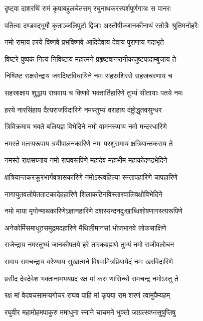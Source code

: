\twolineshloka
{दृष्ट्वा दाशरथिं रामं कृपाबहुलचेतसम्}
{रघुनाथकरस्पर्शपूर्णगात्रः स वानरः}%

\twolineshloka
{पतित्वा दण्डवद्भूमौ कृताञ्जलिपुटो द्विजाः}
{अस्तौषीज्जानकीनाथं स्तोत्रैः श्रुतिमनोहरैः}%


\twolineshloka
{नमो रामाय हरये विष्णवे प्रभविष्णवे}
{आदिदेवाय देवाय पुराणाय गदाभृते}%

\twolineshloka
{विष्टरे पुष्पकं नित्यं निविष्टाय महात्मने}
{प्रहृष्टवानरानीकजुष्टपादाम्बुजाय ते}%

\twolineshloka
{निष्पिष्ट राक्षसेन्द्राय जगदिष्टविधायिने}
{नमः सहस्रशिरसे सहस्रचरणाय च}%

\twolineshloka
{सहस्राक्षाय शुद्धाय राघवाय च विष्णवे}
{भक्तार्तिहारिणे तुभ्यं सीतायाः पतये नमः}%

\twolineshloka
{हरये नारसिंहाय दैत्यराजविदारिणे}
{नमस्तुभ्यं वराहाय दंष्ट्रोद्धृतवसुन्धर}%

\twolineshloka
{त्रिविक्रमाय भवते बलियज्ञ विभेदिने}
{नमो वामनरूपाय नमो मन्दरधारिणे}%

\twolineshloka
{नमस्ते मत्स्यरूपाय त्रयीपालनकारिणे}
{नमः परशुरामाय क्षत्रियान्तकराय ते}%

\twolineshloka
{नमस्ते राक्षसघ्नाय नमो राघवरूपिणे}
{महादेव महाभीम महाकोदण्डभेदिने}%

\twolineshloka
{क्षत्रियान्तकरक्रूरभार्गवत्रासकारिणे}
{नमोऽस्त्वहिल्या सन्तापहारिणे चापहारिणे}%

\twolineshloka
{नागायुतवलोपेतताटकादेहहारिणे}
{शिलाकठिनविस्तारवालिवक्षोविभेदिने}%

\twolineshloka
{नमो माया मृगोन्माथकारिणेऽज्ञानहारिणे}
{दशस्यन्दनदुःखाब्धिशोषणागस्त्यरूपिणे}%

\twolineshloka
{अनेकोर्मिसमाधूतसमुद्रमदहारिणे}
{मैथिलीमानसां भोजभानवे लोकसाक्षिणे}%

\twolineshloka
{राजेन्द्राय नमस्तुभ्यं जानकीपतये हरे}
{तारकब्रह्मणे तुभ्यं नमो राजीवलोचन}%

\twolineshloka
{रामाय रामचन्द्राय वरेण्याय सुखात्मने}
{विश्वामित्रप्रियायेदं नमः खरविदारिणे}%

\twolineshloka
{प्रसीद देवदेवेश भक्तानामभयप्रद}
{रक्ष मां करु णासिन्धो रामचन्द्र नमोऽस्तु ते}%

\twolineshloka
{रक्ष मां वेदवचसामप्यगोचर राघव}
{पाहि मां कृपया राम शरणं त्वामुपैम्यहम्}%

\twolineshloka
{रघुवीर महामोहमपाकुरु ममाधुना}
{स्नाने चाचमने भुक्तो जाग्रत्स्वप्नसुषुप्तिषु}%

